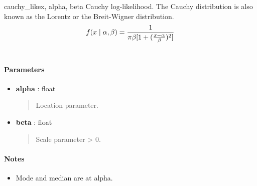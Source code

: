 \hypertarget{pymc.distributions.cauchy_like}{}\begin{funcdesc}{cauchy\_like}{x, alpha, beta}
Cauchy log-likelihood. The Cauchy distribution is also known as the
Lorentz or the Breit-Wigner distribution.
\begin{gather}
\begin{split}f(x \mid \alpha, \beta) = \frac{1}{\pi \beta [1 + (\frac{x-\alpha}{\beta})^2]}\end{split}\notag\\\begin{split}\end{split}\notag
\end{gather}
\paragraph{Parameters}
\begin{itemize}
\item[] \textbf{alpha} : float
\begin{quote}

Location parameter.
\end{quote}

\item[] \textbf{beta} : float
\begin{quote}

Scale parameter \textgreater{} 0.
\end{quote}
\end{itemize}
\paragraph{Notes}
\begin{itemize}
\item {} 
Mode and median are at alpha.

\end{itemize}
\end{funcdesc}

